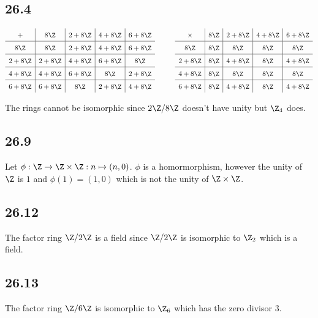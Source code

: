 \documentclass[12pt,titlepage]{extarticle}
\begin{document}
\subsection*{26.4}
\[
    \def\arraystretch{1.5}
    \begin{array}{c|c|c|c|c}
        +        & 8 \Z     & 2 + 8 \Z & 4 + 8 \Z & 6 + 8 \Z \\\hline
        8 \Z     & 8 \Z     & 2 + 8 \Z & 4 + 8 \Z & 6 + 8 \Z \\\hline
        2 + 8 \Z & 2 + 8 \Z & 4 + 8 \Z & 6 + 8 \Z & 8 \Z     \\\hline
        4 + 8 \Z & 4 + 8 \Z & 6 + 8 \Z & 8 \Z     & 2 + 8 \Z \\\hline
        6 + 8 \Z & 6 + 8 \Z & 8 \Z     & 2 + 8 \Z & 4 + 8 \Z \\
    \end{array}
    \hspace{1cm}
    \begin{array}{c|c|c|c|c}
        \times   & 8 \Z     & 2 + 8 \Z & 4 + 8 \Z & 6 + 8 \Z \\\hline
        8 \Z     &     8 \Z &     8 \Z &     8 \Z &     8 \Z \\\hline
        2 + 8 \Z &     8 \Z & 4 + 8 \Z &     8 \Z & 4 + 8 \Z \\\hline
        4 + 8 \Z &     8 \Z &     8 \Z &     8 \Z &     8 \Z \\\hline
        6 + 8 \Z &     8 \Z & 4 + 8 \Z &     8 \Z & 4 + 8 \Z \\
    \end{array}
\]

The rings cannot be isomorphic since $2 \Z / 8 \Z$ doesn't have unity but $\Z_4$ does.

\subsection*{26.9}
Let $\phi : \Z \to \Z \times \Z : n \mapsto (n, 0)$. $\phi$ is a homormorphism, however the unity of $\Z$ is $1$ and $\phi(1) = (1, 0)$ which is not the unity of $\Z \times \Z$.

\subsection*{26.12}
The factor ring $\Z / 2 \Z$ is a field since $\Z / 2 \Z$ is isomorphic to $\Z_2$ which is a field.

\subsection*{26.13}
The factor ring $\Z / 6 \Z$ is isomorphic to $\Z_6$ which has the zero divisor $3$.
\end{document}
